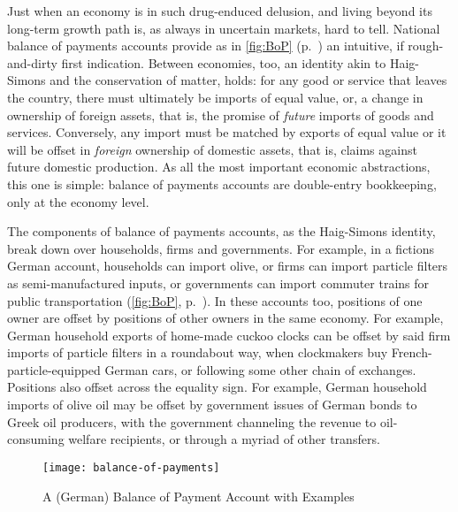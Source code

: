 Just when an economy is in such drug-enduced delusion, and living beyond its long-term growth path is, as always in uncertain markets, hard to tell.
National balance of payments accounts provide as in \autoref{fig:BoP} (p.~\pageref{fig:BoP}) an intuitive, if rough-and-dirty first indication.
Between economies, too, an identity akin to Haig-Simons and the conservation of matter, holds:
for any good or service that leaves the country, there must ultimately be imports of equal value, or, a change in ownership of foreign assets, that is, the promise of \emph{future} imports of goods and services.
Conversely, any import must be matched by exports of equal value or it will be offset in \emph{foreign} ownership of domestic assets, that is, claims against future domestic production.
As all the most important economic abstractions, this one is simple:
balance of payments accounts are double-entry bookkeeping, only at the economy level.

The components of balance of payments accounts, as the Haig-Simons identity, break down over households, firms and governments.
For example, in a fictions German account, households can import olive, or firms can import particle filters as semi-manufactured inputs, or governments can import commuter trains for public transportation (\autoref{fig:BoP}, p.~\pageref{fig:BoP}).
In these accounts too, positions of one owner are offset by positions of other owners in the same economy.
For example, German household exports of home-made cuckoo clocks can be offset by said firm imports of particle filters in a roundabout way, when clockmakers buy French-particle-equipped German cars, or following some other chain of exchanges.
Positions  also offset across the equality sign.
For example, German household imports of olive oil may be offset by government issues of German bonds to Greek oil producers, with the government channeling the revenue to oil-consuming welfare recipients, or through a myriad of other transfers.

\begin{figure}[htbp]
	\begin{center}
	\texttt{[image: balance-of-payments]}
	\caption{A (German) Balance of Payment Account with Examples}
	\label{fig:balance-of-payments}
	\end{center}
\end{figure}

